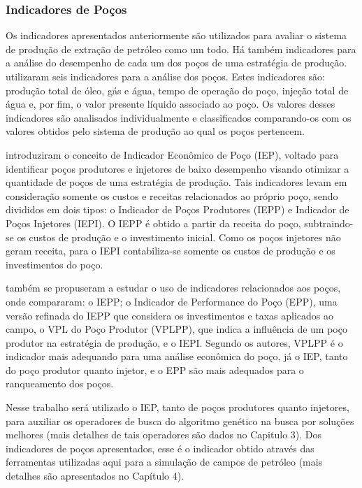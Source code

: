 \subsubsection{Indicadores de Poços}

Os indicadores apresentados anteriormente são utilizados para avaliar o sistema de produção de extração de petróleo como um todo. Há também indicadores para a análise do desempenho de cada um dos poços de uma estratégia de produção. \cite{Moreno2002} utilizaram seis indicadores para a análise dos poços. Estes indicadores são: produção total de óleo, gás e água, tempo de operação do poço, injeção total de água e, por fim, o valor presente líquido associado ao poço.  Os valores desses indicadores são analisados individualmente e classificados comparando-os com os valores obtidos pelo sistema de produção ao qual os poços pertencem.

 introduziram o conceito de Indicador Econômico de Poço (IEP), voltado para identificar poços produtores e injetores de baixo desempenho visando otimizar a quantidade de poços de uma estratégia de produção. Tais indicadores levam em consideração somente os custos e receitas relacionados ao próprio poço, sendo divididos em dois tipos: o Indicador de Poços Produtores (IEPP) e Indicador de Poços Injetores (IEPI). O IEPP é obtido a partir da receita do poço, subtraindo-se os custos de produção e o investimento inicial. Como os poços injetores não geram receita, para o IEPI contabiliza-se somente os custos de produção e os investimentos do poço.

 também se propuseram a estudar o uso de indicadores relacionados aos poços, onde compararam: o IEPP; o Indicador de Performance do Poço (EPP), uma versão refinada do IEPP que considera os investimentos e taxas aplicados ao campo, o VPL do Poço Produtor (VPLPP), que indica a influência de um poço produtor na estratégia de produção, e o IEPI. Segundo os autores, VPLPP é o indicador mais adequando para uma análise econômica do poço, já o IEP, tanto do poço produtor quanto injetor, e o EPP são mais adequados para o ranqueamento dos poços.

Nesse trabalho será utilizado o IEP, tanto de poços produtores quanto injetores, para auxiliar os operadores de busca do algoritmo genético na busca por soluções melhores (mais detalhes de tais operadores são dados no Capitulo 3). Dos indicadores de poços apresentados, esse é o indicador obtido através das ferramentas utilizadas aqui para a simulação de campos de petróleo (mais detalhes são apresentados no Capítulo 4).

